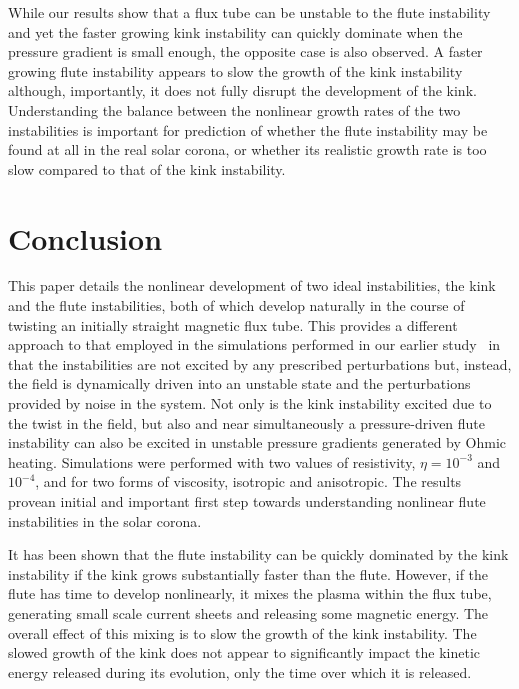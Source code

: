 \documentclass[fleqn,usenatbib]{mnras}
\newcommand{\rs}[2]{{#2}}
\begin{document}
\rs{These}{While our} results show that a flux tube can be unstable to
the flute instability and yet the faster growing kink
instability can quickly dominate when the pressure gradient is small
enough\rs{. However}{}, the opposite case is also observed\rs{,
  where}{. A faster} growing flute instability appears to slow the growth of
the kink instability although, importantly, it does not fully disrupt
the development of the kink. Understanding the balance between the
nonlinear growth rates of the two instabilities is important \rs{in
understanding}{for prediction of} whether the flute instability may be found
at all in the real solar corona, or whether \rs{a}{its} realistic growth rate is
too slow compared to that of the kink instability. 

\section{Conclusion}
\label{sec-conclusions}

This \rs{chapter}{paper} details the nonlinear development of two
ideal instabilities, the kink and \rs{}{the} flute instabilities,
both of which develop naturally in the course of twisting an initially
straight magnetic flux tube. This provides a different approach to
that employed in the simulations performed in \rs{chapter}{our earlier
  study}~\citep{quinnEffectAnisotropicViscosity2020} in that the
instabilities are not excited by any prescribed perturbations but,
instead, the field is dynamically driven into an unstable state and
the perturbations provided by noise in the system. Not only is the
kink instability excited due to the twist in the field, \rs{}{but also
and near simultaneously} a pressure-driven flute
instability can also be excited in unstable pressure gradients
generated by Ohmic heating. Simulations 
were \rs{run}{performed} \rs{over}{with} two values of resistivity,
$\eta=10^{-3}$ and $10^{-4}$, and for two forms of viscosity, isotropic and
\rs{switching}{anisotropic}\rs{, providing}{. The results prove}an
initial and important first step \rs{into the simulation of}{towards
understanding} nonlinear flute instabilities in the
solar corona.  

It has been shown that the flute instability can be quickly dominated by the kink instability if the kink grows substantially faster than the flute. However, if the flute has time to develop nonlinearly, it mixes the plasma within the flux tube, generating small scale current sheets and releasing some magnetic energy. The overall effect of this mixing is to slow the growth of the kink instability. The slowed growth of the kink does not appear to significantly impact the kinetic energy released during its evolution, only the time over which it is released. 
\end{document}

